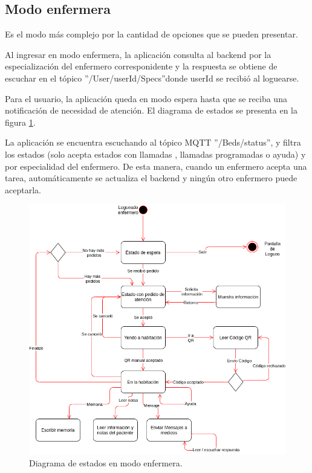 \pagebreak
\subsection{Modo enfermera}

Es el modo más complejo por la cantidad de opciones que se pueden presentar.

Al ingresar en modo enfermera, la aplicación consulta al backend por la especialización del enfermero corresponidente y la respuesta se obtiene de escuchar en el tópico ''/User/userId/Specs''donde userId se recibió al loguearse.

Para el usuario, la aplicación queda en modo espera hasta que se reciba una notificación de necesidad de atención. El diagrama de estados se presenta en la figura \ref{fig: Diagrama de estados en modo enfermera.}.

 

La aplicación se encuentra escuchando al tópico MQTT ''/Beds/status'', y filtra los estados (solo acepta estados con llamadas , llamadas programadas o ayuda) y por especialidad del enfermero. De esta manera, cuando un enfermero acepta una tarea, automáticamente se actualiza el backend y ningún otro enfermero puede aceptarla.



\begin{figure}[ht]
	\centering
	\includegraphics[scale=.60]{./Figures/app/estados-enf.png}
	\caption{ Diagrama de estados en modo enfermera.}
	\label{fig: Diagrama de estados en modo enfermera.}
\end{figure} 



